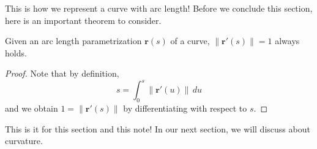 \documentclass[../../../main.tex]{subfiles}
\begin{document}
This is how we represent a curve with arc length! Before we conclude
this section, here is an important theorem to consider.

\begin{theorem}{}{}
Given an arc length parametrization $\mathbf{r}(s)$ of a curve,
$\| \mathbf{r}'(s) \| = 1$ always holds.
\end{theorem}
\begin{proof}
Note that by definition,
\[
s = \int_0^s \| \mathbf{r}'(u) \| \,du
\]
and we obtain $1 = \| \mathbf{r}'(s) \|$ by differentiating with
respect to $s$.
\end{proof}

This is it for this section and this note! In our next section,
we will discuss about curvature.
\end{document}
